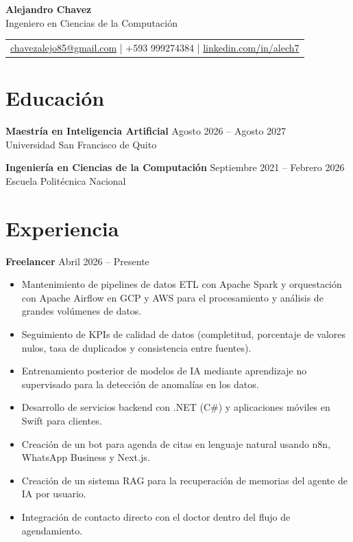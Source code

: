 \documentclass[11pt,a4paper]{article}
\newenvironment{uniformindent}{%
  \begin{list}{}{%
    \setlength{\leftmargin}{2em}
    \setlength{\rightmargin}{0pt}
    \setlength{\topsep}{0pt}
    \setlength{\partopsep}{0pt}
    \setlength{\parsep}{0pt}
    \setlength{\itemsep}{0pt}
  }
  \item[]
}{%
  \end{list}
}
\begin{document}
\begin{center}
    {\LARGE \textbf{Alejandro Chavez}} \\[0.15cm]
    Ingeniero en Ciencias de la Computaci\'on \\[0.2cm]
    \begin{tabular}{@{} c @{}}
        \href{mailto:chavezalejo85@gmail.com}{chavezalejo85@gmail.com} \quad | \quad +593 999274384 \quad | \quad \href{https://www.linkedin.com/in/alech7/}{linkedin.com/in/alech7}
    \end{tabular}
\end{center}

\begin{uniformindent}

\section*{Educaci\'on}

\begin{samepage}
\textbf{Maestr\'ia en Inteligencia Artificial} \hfill Agosto 2026 -- Agosto 2027\\
Universidad San Francisco de Quito\\
\end{samepage}

\begin{samepage}
\textbf{Ingenier\'ia en Ciencias de la Computaci\'on} \hfill Septiembre 2021 -- Febrero 2026\\
Escuela Polit\'ecnica Nacional\\
\end{samepage}

\section*{Experiencia}

\textbf{Freelancer} \hfill Abril 2026 -- Presente
\begin{itemize}
    \item Mantenimiento de pipelines de datos ETL con Apache Spark y orquestaci\'on con Apache Airflow en GCP y AWS para el procesamiento y an\'alisis de grandes vol\'umenes de datos.
    \item Seguimiento de KPIs de calidad de datos (completitud, porcentaje de valores nulos, tasa de duplicados y consistencia entre fuentes).
    \item Entrenamiento posterior de modelos de IA mediante aprendizaje no supervisado para la detecci\'on de anomal\'ias en los datos.
    \item Desarrollo de servicios backend con .NET (C\#) y aplicaciones m\'oviles en Swift para clientes.
    \item Creaci\'on de un bot para agenda de citas en lenguaje natural usando n8n, WhatsApp Business y Next.js.
    \item Creaci\'on de un sistema RAG para la recuperaci\'on de memorias del agente de IA por usuario.
    \item Integraci\'on de contacto directo con el doctor dentro del flujo de agendamiento.
\end{itemize}


\end{uniformindent}
\end{document}
